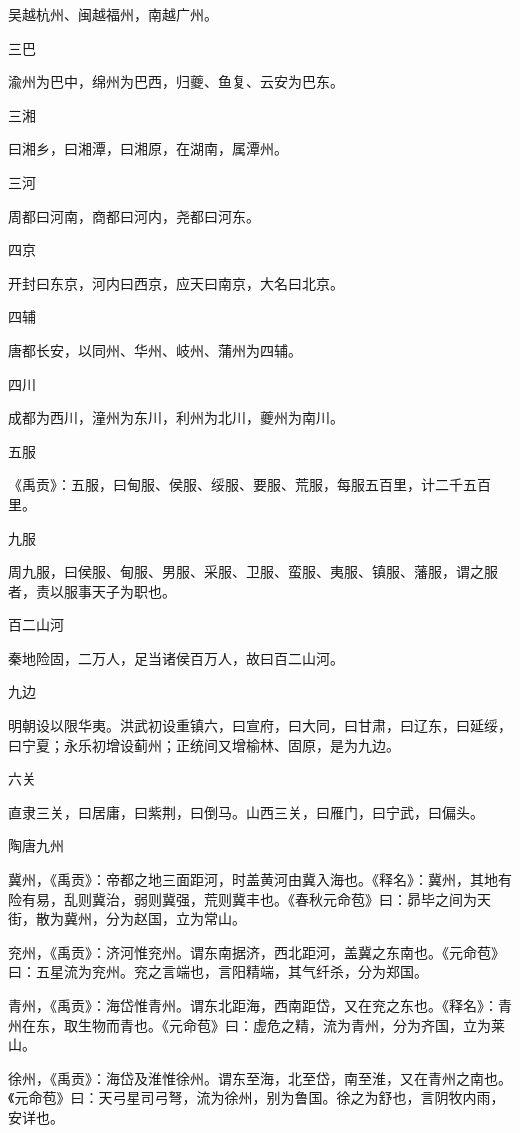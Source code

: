\documentclass[a4paper,12pt,UTF8,twoside]{ctexbook}
\begin{document}
	吴越杭州、闽越福州，南越广州。
	
	三巴
	
	渝州为巴中，绵州为巴西，归夔、鱼复、云安为巴东。
	
	三湘
	
	曰湘乡，曰湘潭，曰湘原，在湖南，属潭州。
	
	三河
	
	周都曰河南，商都曰河内，尧都曰河东。
	
	四京
	
	开封曰东京，河内曰西京，应天曰南京，大名曰北京。
	
	四辅
	
	唐都长安，以同州、华州、岐州、蒲州为四辅。
	
	四川
	
	成都为西川，潼州为东川，利州为北川，夔州为南川。
	
	五服
	
	《禹贡》：五服，曰甸服、侯服、绥服、要服、荒服，每服五百里，计二千五百里。
	
	九服
	
	周九服，曰侯服、甸服、男服、采服、卫服、蛮服、夷服、镇服、藩服，谓之服者，责以服事天子为职也。
	
	百二山河
	
	秦地险固，二万人，足当诸侯百万人，故曰百二山河。
	
	九边
	
	明朝设以限华夷。洪武初设重镇六，曰宣府，曰大同，曰甘肃，曰辽东，曰延绥，曰宁夏；永乐初增设蓟州；正统间又增榆林、固原，是为九边。
	
	六关
	
	直隶三关，曰居庸，曰紫荆，曰倒马。山西三关，曰雁门，曰宁武，曰偏头。
	
	陶唐九州
	
	冀州，《禹贡》：帝都之地三面距河，时盖黄河由冀入海也。《释名》：冀州，其地有险有易，乱则冀治，弱则冀强，荒则冀丰也。《春秋元命苞》曰：昴毕之间为天街，散为冀州，分为赵国，立为常山。
	
	兖州，《禹贡》：济河惟兖州。谓东南据济，西北距河，盖冀之东南也。《元命苞》曰：五星流为兖州。兖之言端也，言阳精端，其气纤杀，分为郑国。
	
	青州，《禹贡》：海岱惟青州。谓东北距海，西南距岱，又在兖之东也。《释名》：青州在东，取生物而青也。《元命苞》曰：虚危之精，流为青州，分为齐国，立为莱山。
	
	徐州，《禹贡》：海岱及淮惟徐州。谓东至海，北至岱，南至淮，又在青州之南也。《元命苞》曰：天弓星司弓弩，流为徐州，别为鲁国。徐之为舒也，言阴牧内雨，安详也。
	
\end{document}
